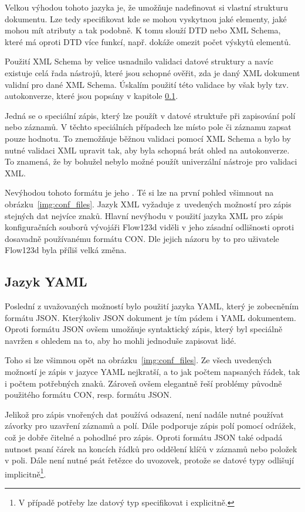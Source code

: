 \documentclass[FM,bw,DP]{tulthesis}
\begin{document}
Velkou výhodou tohoto jazyka je, že umožňuje nadefinovat si vlastní strukturu dokumentu. Lze tedy specifikovat kde se mohou vyskytnou jaké elementy, jaké mohou mít atributy a tak podobně. K tomu slouží DTD nebo XML Schema, které má oproti DTD více funkcí, např. dokáže omezit počet výskytů elementů.

Použití XML Schema by velice usnadnilo validaci datové struktury a navíc existuje celá řada nástrojů, které jsou schopné ověřit, zda je daný XML dokument validní pro dané XML Schema. Úskalím použití této validace by však byly tzv. autokonverze, které jsou popsány v kapitole \ref{}.

Jedná se o speciální zápis, který lze použít v datové struktuře při zapisování polí nebo záznamů. V těchto speciálních případech lze místo pole či záznamu zapsat pouze hodnotu. To znemožňuje běžnou validaci pomocí XML Schema a bylo by nutné validaci XML upravit tak, aby byla schopná brát ohled na autokonverze. To znamená, že by bohužel nebylo možné použít univerzální nástroje pro validaci XML.

Nevýhodou tohoto formátu je jeho . Té si lze na první pohled všimnout na obrázku~\ref{img:conf_files}. Jazyk XML vyžaduje z~uvedených možností pro zápis stejných dat nejvíce znaků. Hlavní nevýhodu v použití jazyka XML pro zápis konfiguračních souborů vývojáři Flow123d viděli v jeho zásadní odlišnosti oproti dosavadně po\-u\-ží\-va\-né\-mu formátu CON. Dle jejich názoru by to pro uživatele Flow123d byla příliš velká změna.

\subsection{Jazyk YAML}

Poslední z uvažovaných možností bylo použití jazyka YAML, který je zobecněním formátu JSON. Kterýkoliv JSON dokument je tím pádem i YAML dokumentem. Oproti formátu JSON ovšem umožňuje syntaktický zápis, který byl speciálně navržen s ohledem na to, aby ho mohli jednoduše zapisovat lidé.

Toho si lze všimnou opět na obrázku~\ref{img:conf_files}. Ze všech uvedených možností je zápis v jazyce YAML nejkratší, a to jak počtem napsaných řádek, tak i počtem potřebných znaků. Zároveň ovšem elegantně řeší problémy původně použitého formátu CON, resp. formátu JSON.

Jelikož pro zápis vnořených dat používá odsazení, není nadále nutné používat závorky pro uzavření záznamů a polí. Dále podporuje zápis polí pomocí odrážek, což je dobře čitelné a pohodlné pro zápis. Oproti formátu JSON také odpadá nutnost psaní čárek na koncích řádků pro oddělení klíčů v záznamů nebo položek v poli. Dále není nutné psát řetězce do uvozovek, protože se datové typy odlišují implicitně\footnote{V případě potřeby lze datový typ specifikovat i explicitně.}.
\end{document}
